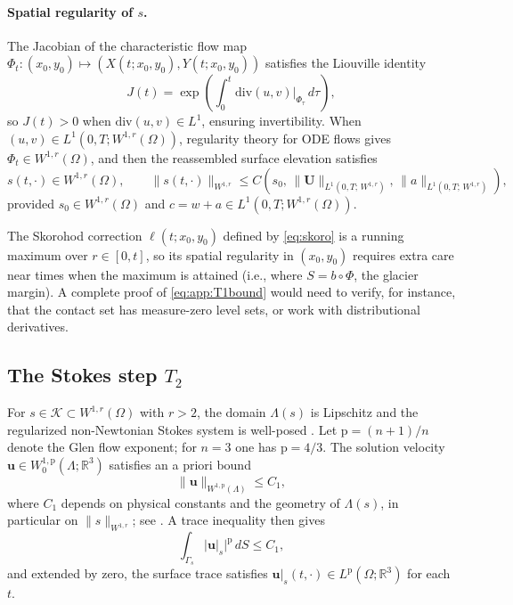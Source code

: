 \documentclass[hidelinks,onefignum,onetabnum,final]{siamart220329}  %
\newcommand{\RR}{\mathbb{R}}
\newcommand{\bu}{\mathbf{u}}
\newcommand{\bU}{\mathbf{U}}
\newcommand{\cK}{\mathcal{K}}
\newcommand{\pp}{\mathrm{p}}
\begin{document}
\paragraph{Spatial regularity of $s$.}
The Jacobian of the characteristic flow map
$\Phi_t:(x_0,y_0)\mapsto(X(t;x_0,y_0),Y(t;x_0,y_0))$ satisfies the
Liouville identity
\begin{equation}
J(t) = \exp\!\left(\int_0^t \mathrm{div}(u,v)\big|_{\Phi_\tau} \, d\tau\right),
\label{eq:app:jacobian}
\end{equation}
so $J(t)>0$ when $\mathrm{div}(u,v) \in L^1$, ensuring invertibility.
When $(u,v)\in L^1(0,T;W^{1,r}(\Omega))$, regularity theory for ODE
flows gives $\Phi_t \in W^{1,r}(\Omega)$, and then the reassembled
surface elevation satisfies
\begin{equation}
s(t,\cdot) \in W^{1,r}(\Omega), \qquad
\|s(t,\cdot)\|_{W^{1,r}} \le
C\!\left(s_0,\, \|\bU\|_{L^1(0,T;\,W^{1,r})},\, \|a\|_{L^1(0,T;\,W^{1,r})}\right),
\label{eq:app:T1bound}
\end{equation}
provided $s_0\in W^{1,r}(\Omega)$ and $c = w+a \in L^1(0,T;W^{1,r}(\Omega))$.

\begin{remark}
The Skorohod correction $\ell(t;x_0,y_0)$ defined by \eqref{eq:skoro}
is a running maximum over $r\in[0,t]$, so its spatial regularity in
$(x_0,y_0)$ requires extra care near times when the maximum is
attained (i.e., where $S = b\circ\Phi$, the glacier margin).
A complete proof of \eqref{eq:app:T1bound} would need to verify,
for instance, that the contact set has measure-zero level sets,
or work with distributional derivatives.
\end{remark}

\subsection{The Stokes step \texorpdfstring{$T_2$}{T2}}

For $s\in\cK\subset W^{1,r}(\Omega)$ with $r>2$, the domain
$\Lambda(s)$ is Lipschitz and the regularized non-Newtonian Stokes
system is well-posed \cite{JouvetRappaz2011}.
Let $\pp = (n+1)/n$ denote the Glen flow exponent; for
$n=3$ one has $\pp=4/3$.  The solution velocity
$\bu\in W_0^{1,\pp}(\Lambda;\RR^3)$ satisfies an a priori bound
\begin{equation}
\|\bu\|_{W^{1,\pp}(\Lambda)} \le C_1,  \label{eq:app:apriori}
\end{equation}
where $C_1$ depends on physical constants and the geometry of
$\Lambda(s)$, in particular on $\|s\|_{W^{1,r}}$; see \cite{Bueler2025}.
A trace inequality then gives
\begin{equation}
\int_{\Gamma_s} |\bu|_s|^{\pp} \, dS \le C_1,  \label{eq:app:trace}
\end{equation}
and extended by zero, the surface trace satisfies
$\bu|_s(t,\cdot) \in L^{\pp}(\Omega;\RR^3)$ for each $t$.
\end{document}
